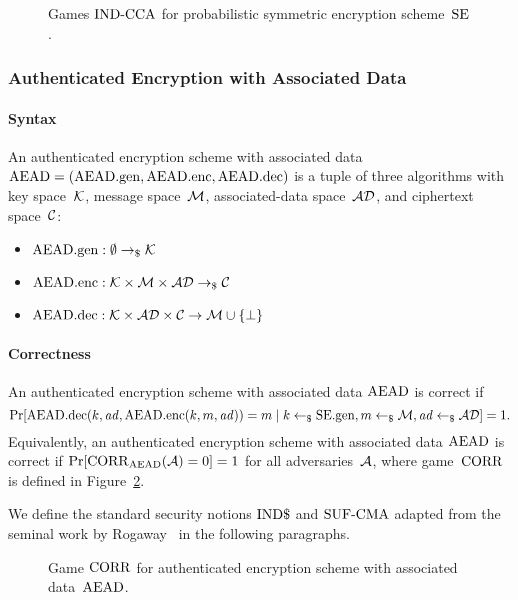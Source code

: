 \documentclass[a4paper,orivec]{llncs}
\begin{document}
\begin{figure}[!ht]
    \centering
    \nicoresetlinenr%
    \fbox{%
        \scalebox{\codescalefactor}{%
        }%
    }
    \caption{%
        Games ${\mathrm{IND}\text{-}\mathrm{CCA}}$ for probabilistic symmetric encryption scheme~$\mathrm{SE}$.
    }
    \label{fig:sym:enc:ind:prob}
\end{figure}


\subsubsection{Authenticated Encryption with Associated Data}

\paragraph{Syntax}
An authenticated encryption scheme with associated data $\mathrm{AEAD}=(\mathrm{AEAD}.\mathrm{gen},\mathrm{AEAD}.\mathrm{enc},\mathrm{AEAD}.\mathrm{dec})$ is a tuple of three algorithms with key space~$\mathcal{K}$, message space~$\mathcal{M}$, associated-data space~$\mathcal{AD}$, and ciphertext space~$\mathcal{C}$:

\begin{itemize}
    \item $\mathrm{AEAD}.\mathrm{gen}: \emptyset \to_\$ \mathcal{K}$
    \item $\mathrm{AEAD}.\mathrm{enc}: \mathcal{K}\times\mathcal{M}\times\mathcal{AD} \to_\$ \mathcal{C}$
    \item $\mathrm{AEAD}.\mathrm{dec}: \mathcal{K}\times\mathcal{AD}\times\mathcal{C} \to \mathcal{M}\cup\{\bot\}$
\end{itemize}

\paragraph{Correctness}
An authenticated encryption scheme with associated data $\mathrm{AEAD}$ is correct if 
\[
\Pr[\mathrm{AEAD}.\mathrm{dec}(k,\mathit{ad},\mathrm{AEAD}.\mathrm{enc}(k,m,\mathit{ad}))=m\mid k\gets_\$\mathrm{SE}.\mathrm{gen},m\gets_\$\mathcal{M},\mathit{ad}\gets_\$\mathcal{AD}]=1\text{.}
\]
Equivalently, an authenticated encryption scheme with associated data $\mathrm{AEAD}$ is correct if $\Pr[\mathrm{CORR}_{\mathrm{AEAD}}(\mathcal{A})=0]=1$ for all adversaries~$\mathcal{A}$, where game~$\mathrm{CORR}$ is defined in Figure~\ref{fig:sym:aenc:corr}.

We define the standard security notions ${\mathrm{IND}\$}$ and ${\mathrm{SUF}\text{-}\mathrm{CMA}}$ adapted from the seminal work by Rogaway~\cite{CCS:Rogaway02} in the following paragraphs.

\begin{figure}[!ht]
    \centering
    \nicoresetlinenr%
    \fbox{%
        \scalebox{\codescalefactor}{%
        }%
    }
    \caption{%
        Game $\mathrm{CORR}$ for authenticated encryption scheme with associated data~$\mathrm{AEAD}$.
    }
    \label{fig:sym:aenc:corr}
\end{figure}
\end{document}
